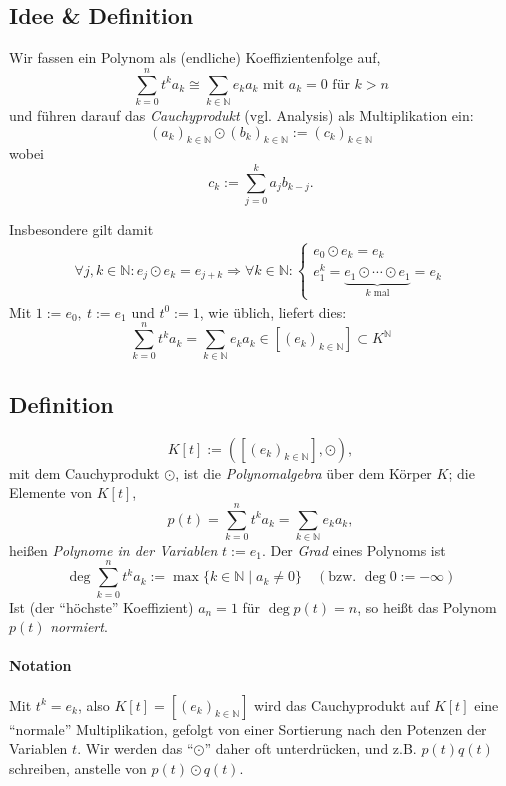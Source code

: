 \subsection{Idee \& Definition} 
	\begin{Definition}[Cauchyprodukt]
		Wir fassen ein Polynom als (endliche) Koeffizientenfolge auf,
		\[ \sum_{k=0}^{n} t^ka_k \cong
		\sum_{k\in \mathbb{N}}e_ka_k \text{ mit } a_k = 0 \text{ für } k>n \]
	und führen darauf das \emph{Cauchyprodukt} (vgl. Analysis) als Multiplikation ein:
		\[ (a_k)_{k\in \mathbb{N}} \odot (b_k)_{k\in \mathbb{N}} := (c_k)_{k\in \mathbb{N}} \]
	wobei
		\[ c_k := \sum_{j=0}^{k}a_jb_{k-j}. \]
	\end{Definition}
	Insbesondere gilt damit
		\begin{gather*}
		\forall j,k\in \mathbb{N}: e_j \odot e_k = e_{j+k}
		\Rightarrow \forall k\in \mathbb{N}:
			\begin{cases}
				e_0 \odot e_k = e_k\\
				e_1^k = \underset{k \text{ mal}}{\underbrace{e_1 \odot \cdots \odot e_1}} = e_k
			\end{cases}
		\end{gather*}
	Mit $ 1:= e_0,\ t:= e_1 $ und $ t^0 := 1 $, wie üblich, liefert dies:
		\[ \sum_{k=0}^{n}t^ka_k = \sum_{k\in \mathbb{N}}e_ka_k \in [(e_k)_{k\in \mathbb{N}}]\subset K^\mathbb{N} \]
		
\subsection{Definition}
		\begin{Definition}[Polynomalgebra]
			\[ K[t] := ([(e_k)_{k\in \mathbb{N}}],\odot) ,\]
	mit dem Cauchyprodukt $ \odot $, ist die \emph{Polynomalgebra} über dem Körper $ K $; die Elemente von $ K[t] $,
		\[ p(t) = \sum_{k=0}^{n}t^ka_k = \sum_{k\in\mathbb{N}}e_ka_k, \]
	heißen \emph{Polynome in der Variablen} $ t:= e_1 $.
	Der \emph{Grad} eines Polynoms ist
		\[  \deg\sum_{k=0}^{n}t^ka_k := \max \{k\in \mathbb{N}\mid a_k \neq 0\}  \quad \left( \text{bzw. } \deg 0 := -\infty \right) \]
	Ist (der "`höchste"' Koeffizient) $ a_n = 1 $ für $ \deg p(t) = n $, so heißt das Polynom $ p(t) $ \emph{normiert}.
		\end{Definition}
\paragraph{Notation}
	Mit $t^k = e_{k}$, also $ K[t] = [(e_k)_{k\in \mathbb{N}}] $
	wird das Cauchyprodukt auf $ K[t] $ eine "`normale"' Multiplikation, gefolgt von einer Sortierung nach den Potenzen der Variablen $ t $. Wir werden das "`$ \odot $"' daher oft unterdrücken, und z.B. $ p(t)q(t) $ schreiben, anstelle von $ p(t) \odot q(t) $.
